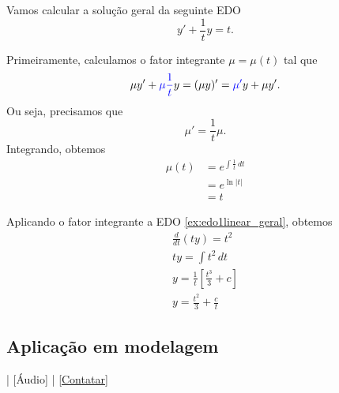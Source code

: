 \begin{ex}
  Vamos calcular a solução geral da seguinte EDO
  \begin{equation}\label{ex:edo1linear_geral}
    y' + \frac{1}{t}y = t.
  \end{equation}

  Primeiramente, calculamos o fator integrante $\mu = \mu(t)$ tal que
  \begin{equation}
    \mu y' + {\color{blue}\mu \frac{1}{t}} y = (\mu y)' = {\color{blue}\mu'}y + \mu y'.
  \end{equation}
  Ou seja, precisamos que
  \begin{equation}
    \mu' = \frac{1}{t}\mu.
  \end{equation}
  Integrando, obtemos
  \begin{align}
    \mu(t) &= e^{\int \frac{1}{t}\,dt} \\
    &= e^{\ln|t|} \\
    &= t
  \end{align}

  Aplicando o fator integrante a EDO \eqref{ex:edo1linear_geral}, obtemos
  \begin{gather}
    \frac{d}{dt}\left(t y\right) = t^2 \\
    ty = \int t^2\,dt \\
    y = \frac{1}{t}\left[\frac{t^3}{3} + c\right] \\
    y = \frac{t^2}{3} + \frac{c}{t}
  \end{gather}
\end{ex}

\subsection{Aplicação em modelagem}

\begin{flushright}
  [Vídeo] | [Áudio] | \href{https://phkonzen.github.io/notas/contato.html}{[Contatar]}
\end{flushright}

